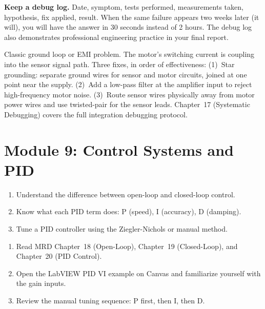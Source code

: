 \documentclass[11pt,letterpaper]{article}
\begin{document}
\begin{protip}
\textbf{Keep a debug log.} Date, symptom, tests performed, measurements taken, hypothesis, fix applied, result. When the same failure appears two weeks later (it will), you will have the answer in 30 seconds instead of 2 hours. The debug log also demonstrates professional engineering practice in your final report.
\end{protip}

\begin{faqbox}
Classic ground loop or EMI problem. The motor's switching current is coupling into the sensor signal path. Three fixes, in order of effectiveness: (1)~Star grounding: separate ground wires for sensor and motor circuits, joined at one point near the supply. (2)~Add a low-pass filter at the amplifier input to reject high-frequency motor noise. (3)~Route sensor wires physically away from motor power wires and use twisted-pair for the sensor leads. Chapter~17 (Systematic Debugging) covers the full integration debugging protocol.
\end{faqbox}

\section{Module 9: Control Systems and PID}

\begin{priorities}
\begin{enumerate}[leftmargin=*, itemsep=1pt, topsep=0pt]
    \item Understand the difference between open-loop and closed-loop control.
    \item Know what each PID term does: P (speed), I (accuracy), D (damping).
    \item Tune a PID controller using the Ziegler-Nichols or manual method.
\end{enumerate}
\end{priorities}

\begin{tcolorbox}[colback=minesblue!3, colframe=minesblue!40, boxrule=0.5pt, arc=2pt, left=6pt, right=6pt, top=3pt, bottom=3pt, fonttitle=\small\bfseries\color{minesblue}, title={Before You Start: Module 9}]
\small
\begin{enumerate}[nosep,leftmargin=*]
\item Read MRD Chapter~18 (Open-Loop), Chapter~19 (Closed-Loop), and Chapter~20 (PID Control).
\item Open the LabVIEW PID VI example on Canvas and familiarize yourself with the gain inputs.
\item Review the manual tuning sequence: P first, then I, then D.
\end{enumerate}
\end{tcolorbox}
\end{document}
